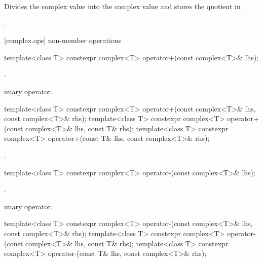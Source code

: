 \begin{itemdescr}
\pnum
\effects
Divides the complex value  into the complex value
and stores the quotient in
.

\pnum
\returns
{}.
\end{itemdescr}

[complex.ops]{ non-member operations}

%
\begin{itemdecl}
template<class T> constexpr complex<T> operator+(const complex<T>& lhs);
\end{itemdecl}

\begin{itemdescr}
\pnum
\returns
{}.

\pnum
\remarks
unary operator.
\end{itemdescr}

\begin{itemdecl}
template<class T> constexpr complex<T> operator+(const complex<T>& lhs, const complex<T>& rhs);
template<class T> constexpr complex<T> operator+(const complex<T>& lhs, const T& rhs);
template<class T> constexpr complex<T> operator+(const T& lhs, const complex<T>& rhs);
\end{itemdecl}

\begin{itemdescr}
\pnum
\returns
{}.
\end{itemdescr}

%
\begin{itemdecl}
template<class T> constexpr complex<T> operator-(const complex<T>& lhs);
\end{itemdecl}

\begin{itemdescr}
\pnum
\returns
{}.

\pnum
\remarks
unary operator.
\end{itemdescr}

%
\begin{itemdecl}
template<class T> constexpr complex<T> operator-(const complex<T>& lhs, const complex<T>& rhs);
template<class T> constexpr complex<T> operator-(const complex<T>& lhs, const T& rhs);
template<class T> constexpr complex<T> operator-(const T& lhs, const complex<T>& rhs);
\end{itemdecl}

